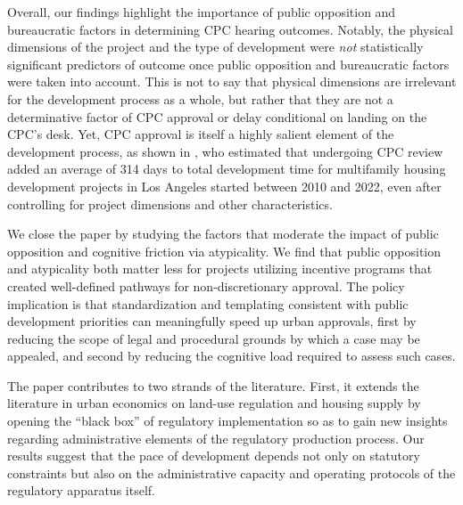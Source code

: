 Overall, our findings highlight the importance of public opposition and bureaucratic factors in determining CPC hearing outcomes. Notably, the physical dimensions of the project and the type of development were \emph{not} statistically significant predictors of outcome once public opposition and bureaucratic factors were taken into account. 
This is not to say that physical dimensions are irrelevant for the development process as a whole, but rather that they are not a determinative factor of CPC approval or delay conditional on landing on the CPC's desk. Yet, CPC approval is itself a highly salient element of the development process, as shown in \citet{gabrielkung2025}, who estimated that undergoing CPC review added an average of 314 days to total development time for multifamily housing development projects in Los Angeles started between 2010 and 2022, even after controlling for project dimensions and other characteristics.

We close the paper by studying the factors that moderate the impact of public opposition and cognitive friction via atypicality. We find that public opposition and atypicality both matter less for projects utilizing incentive programs that created well-defined pathways for non-discretionary approval. The policy implication is that standardization and templating consistent with public development priorities can meaningfully speed up urban approvals, first by reducing the scope of legal and procedural grounds by which a case may be appealed, and second by reducing the cognitive load required to assess such cases. 


The paper contributes to two strands of the literature. First, it extends the literature in urban economics on land-use regulation and housing supply by opening the ``black box'' of regulatory implementation so as to gain new insights regarding administrative elements of the regulatory production process. Our results suggest that the pace of development depends not only on statutory constraints but also on the administrative capacity and operating protocols of the regulatory apparatus itself. 

